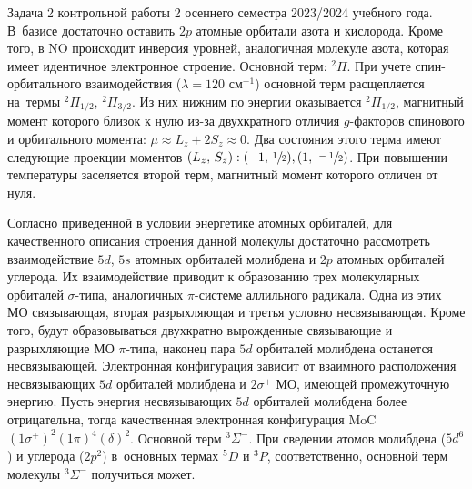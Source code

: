  Задача 2 контрольной работы 2 осеннего семестра 2023/2024 учебного года. В~базисе достаточно оставить $2p$ атомные орбитали азота и кислорода. Кроме того, в NO происходит инверсия уровней, аналогичная молекуле азота, которая имеет идентичное электронное строение. Основной терм: $^2\Pi$. При учете спин-орбитального взаимодействия ($\lambda=\text{120}$ см$^{-1}$) основной терм расщепляется на~термы $^2\Pi_{1/2}$, $^2\Pi_{3/2}$. Из них нижним по энергии оказывается $^2\Pi_{1/2}$, магнитный момент которого близок к нулю из-за двухкратного отличия $g$-факторов спинового и орбитального момента: $\mu \approx L_z + 2S_z \approx 0$. Два состояния этого терма имеют следующие проекции моментов $(L_z,\,S_z): (-1,\,\sfrac12), (1,\,\sfrac{-1}{2})$. При повышении температуры заселяется второй терм, магнитный момент которого отличен от нуля.\par
{} Согласно приведенной в условии энергетике атомных орбиталей, для качественного описания строения данной молекулы достаточно рассмотреть взаимодействие $5d$, $5s$ атомных орбиталей молибдена и $2p$ атомных орбиталей углерода. Их взаимодействие приводит к образованию трех молекулярных орбиталей $\sigma$-типа, аналогичных $\pi$-системе аллильного радикала. Одна из этих МО связывающая, вторая разрыхляющая и третья условно несвязывающая. Кроме того, будут образовываться двухкратно вырожденные связывающие и разрыхляющие МО $\pi$-типа, наконец пара $5d$ орбиталей молибдена останется несвязывающей. Электронная конфигурация зависит от взаимного расположения несвязывающих $5d$ орбиталей молибдена и $2\sigma^+$ МО, имеющей промежуточную энергию. Пусть энергия несвязывающих $5d$ орбиталей молибдена более отрицательна, тогда качественная электронная конфигурация MoC $(1\sigma^+)^2(1\pi)^4(\delta)^2$. Основной терм $^3\Sigma^-$. При сведении атомов молибдена ($5d^6$) и углерода ($2p^2$) в~основных термах $^5D$ и $^3P$, соответственно, основной терм молекулы $^3\Sigma^-$ получиться может.\par
